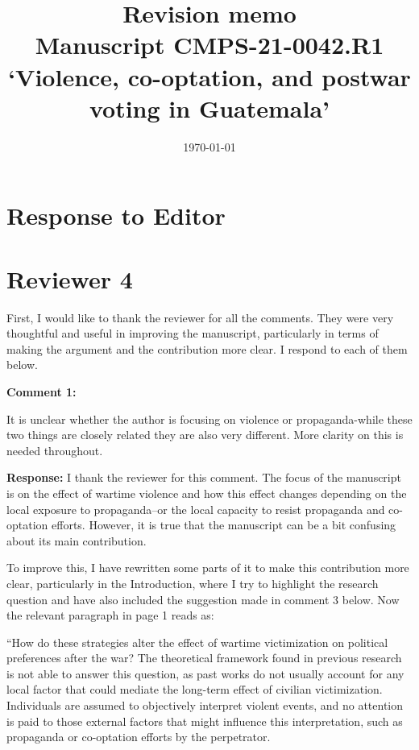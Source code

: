 \documentclass[12pt, a4paper, notitlepage]{article}
\title{\large \textbf{Revision memo}\\{\large Manuscript CMPS-21-0042.R1\\`Violence, co-optation, and postwar voting in Guatemala'}}
\author{}
\date{\today}
\begin{document}
\maketitle

\section*{Response to Editor}

\newpage
\section*{Reviewer 4}

First, I would like to thank the reviewer for all the comments. They were very thoughtful and useful in improving the manuscript, particularly in terms of making the argument and the contribution more clear. I respond to each of them below.

\vspace{15pt}
\noindent\textbf{Comment 1:}
\begin{displayquote}
It is unclear whether the author is focusing on violence or propaganda-while these two things are closely related they are also very different. More clarity on this is needed throughout.
\end{displayquote}

\noindent\textbf{Response:} I thank the reviewer for this comment. The focus of the manuscript is on the effect of wartime violence and how this effect changes depending on the local exposure to propaganda--or the local capacity to resist propaganda and co-optation efforts. However, it is true that the manuscript can be a bit confusing about its main contribution.

To improve this, I have rewritten some parts of it to make this contribution more clear, particularly in the Introduction, where I try to highlight the research question and have also included the suggestion made in comment 3 below. Now the relevant paragraph in page 1 reads as:


``How do these strategies alter the effect of wartime victimization on political preferences after the war?
The theoretical framework found in previous research is not able to answer this question, as past works do not usually account for any local factor that could mediate the long-term effect of civilian victimization.
Individuals are assumed to objectively interpret violent events, and no attention is paid to those external factors that might influence this interpretation, such as propaganda or co-optation efforts by the perpetrator.
\end{document}
